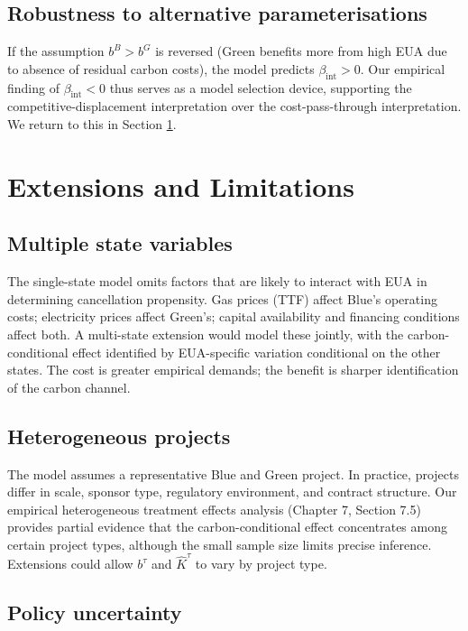 \documentclass[11pt,a4paper]{article}
\newcommand{\bint}{\beta_{\mathrm{int}}}
\begin{document}
\subsection{Robustness to alternative parameterisations}

If the assumption $b^B > b^G$ is reversed (Green benefits more from high EUA due to absence of residual carbon costs), the model predicts $\bint > 0$. Our empirical finding of $\bint < 0$ thus serves as a model selection device, supporting the competitive-displacement interpretation over the cost-pass-through interpretation. We return to this in Section \ref{sec:ch3-extensions}.

\section{Extensions and Limitations}
\label{sec:ch3-extensions}

\subsection{Multiple state variables}

The single-state model omits factors that are likely to interact with EUA in determining cancellation propensity. Gas prices (TTF) affect Blue's operating costs; electricity prices affect Green's; capital availability and financing conditions affect both. A multi-state extension would model these jointly, with the carbon-conditional effect identified by EUA-specific variation conditional on the other states. The cost is greater empirical demands; the benefit is sharper identification of the carbon channel.

\subsection{Heterogeneous projects}

The model assumes a representative Blue and Green project. In practice, projects differ in scale, sponsor type, regulatory environment, and contract structure. Our empirical heterogeneous treatment effects analysis (Chapter 7, Section 7.5) provides partial evidence that the carbon-conditional effect concentrates among certain project types, although the small sample size limits precise inference. Extensions could allow $b^{\tau}$ and $\hat{K}^{\tau}$ to vary by project type.

\subsection{Policy uncertainty}
\end{document}
